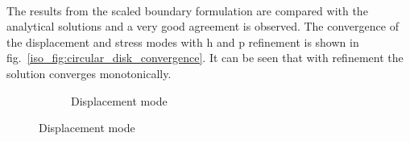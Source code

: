 \paragraph{}
The results from the scaled boundary formulation are compared with the analytical solutions and a very good agreement is observed.
The convergence of the displacement and stress modes with h and p refinement is shown in fig.~\ref{iso_fig:circular_disk_convergence}.
It can be seen that with refinement the solution converges monotonically.
    \begin{figure}[!ht]
        \begin{subfigure}[b]{1\linewidth}
            \centering
            \caption{Displacement mode}
        \end{subfigure}


\end{figure}
